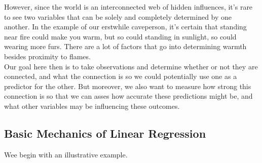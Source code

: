 However, since the world is an interconnected web of hidden influences, it's rare to see two variables that can be solely and completely determined by one another.  In the example of our erstwhile caveperson, it's certain that standing near fire could make you warm, but so could standing in sunlight, so could wearing more furs.  There are a lot of factors that go into determining warmth besides proximity to flames.\\

Our goal here then is to take observations and determine whether or not they are connected, and what the connection is so we could potentially use one as a predictor for the other.  But moreover, we also want to measure how strong this connection is so that we can asses how accurate these predictions might be, and what other variables may be influencing these outcomes.


\subsection{Basic Mechanics of Linear Regression}

Wee begin with an illustrative example.

